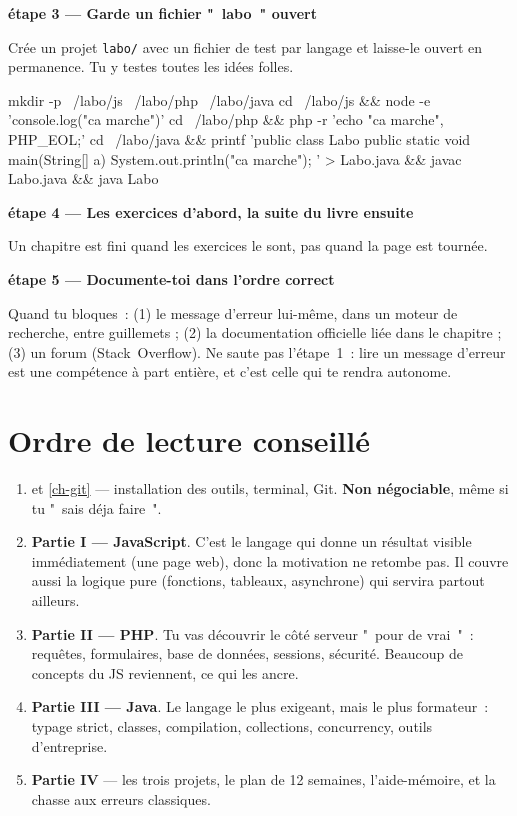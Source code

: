 \documentclass[12pt,a4paper,twoside,openright]{book}
\newcommand{\fichier}[1]{\texttt{\color{pathgreen}#1}}
\newcommand{\etape}[1]{\par\medskip\noindent\textbf{\large #1}\par\smallskip}
\begin{document}
\etape{\'etape 3 --- Garde un fichier "~labo~" ouvert}
Cr\'ee un projet \fichier{labo/} avec un fichier de test par langage et laisse-le ouvert
en permanence. Tu y testes toutes les id\'ees folles.

\begin{terminal}
mkdir -p ~/labo/js ~/labo/php ~/labo/java
cd ~/labo/js && node -e 'console.log("ca marche")'
cd ~/labo/php && php -r 'echo "ca marche", PHP_EOL;'
cd ~/labo/java && printf 'public class Labo { public static void main(String[] a){ System.out.println("ca marche"); } }' > Labo.java && javac Labo.java && java Labo
\end{terminal}

\etape{\'etape 4 --- Les exercices d'abord, la suite du livre ensuite}
Un chapitre est fini quand les exercices le sont, pas quand la page est tourn\'ee.

\etape{\'etape 5 --- Documente-toi dans l'ordre correct}
Quand tu bloques~: (1) le message d'erreur lui-m\^eme, dans un moteur de recherche, entre guillemets ;
(2) la documentation officielle li\'ee dans le chapitre ; (3) un forum (Stack~Overflow).
Ne saute pas l'\'etape~1~: lire un message d'erreur est une comp\'etence \`a part enti\`ere,
et c'est celle qui te rendra autonome.

\section{Ordre de lecture conseill\'e}

\begin{enumerate}
  \item {} et \cref{ch-git} --- installation des outils, terminal, Git.
        \textbf{Non n\'egociable}, m\^eme si tu "~sais d\'eja faire~".
  \item \textbf{Partie I --- JavaScript}. C'est le langage qui donne un r\'esultat visible
        imm\'ediatement (une page web), donc la motivation ne retombe pas. Il couvre aussi la
        logique pure (fonctions, tableaux, asynchrone) qui servira partout ailleurs.
  \item \textbf{Partie II --- PHP}. Tu vas d\'ecouvrir le c\^ot\'e serveur "~pour de vrai~"~: requ\^etes,
        formulaires, base de donn\'ees, sessions, s\'ecurit\'e. Beaucoup de concepts du JS reviennent,
        ce qui les ancre.
  \item \textbf{Partie III --- Java}. Le langage le plus exigeant, mais le plus formateur~: typage
        strict, classes, compilation, collections, concurrency, outils d'entreprise.
  \item \textbf{Partie IV} --- les trois projets, le plan de 12 semaines, l'aide-m\'emoire,
        et la chasse aux erreurs classiques.
\end{enumerate}
\end{document}
